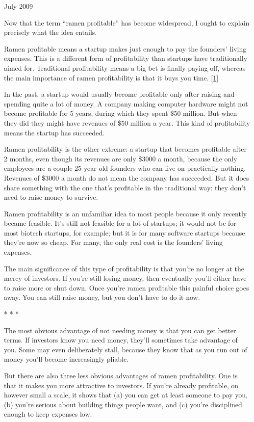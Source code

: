 July 2009

Now that the term ``ramen profitable'' has become widespread, I ought to
explain precisely what the idea entails.

Ramen profitable means a startup makes just enough to pay the founders'
living expenses. This is a different form of profitability than startups
have traditionally aimed for. Traditional profitability means a big bet
is finally paying off, whereas the main importance of ramen
profitability is that it buys you time. {[}\hyperref[f1n]{1}{]}

In the past, a startup would usually become profitable only after
raising and spending quite a lot of money. A company making computer
hardware might not become profitable for 5 years, during which they
spent \$50 million. But when they did they might have revenues of \$50
million a year. This kind of profitability means the startup has
succeeded.

Ramen profitability is the other extreme: a startup that becomes
profitable after 2 months, even though its revenues are only \$3000 a
month, because the only employees are a couple 25 year old founders who
can live on practically nothing. Revenues of \$3000 a month do not mean
the company has succeeded. But it does share something with the one
that's profitable in the traditional way: they don't need to raise money
to survive.

Ramen profitability is an unfamiliar idea to most people because it only
recently became feasible. It's still not feasible for a lot of startups;
it would not be for most biotech startups, for example; but it is for
many software startups because they're now so cheap. For many, the only
real cost is the founders' living expenses.

The main significance of this type of profitability is that you're no
longer at the mercy of investors. If you're still losing money, then
eventually you'll either have to raise more or shut down. Once you're
ramen profitable this painful choice goes away. You can still raise
money, but you don't have to do it now.

* * *

The most obvious advantage of not needing money is that you can get
better terms. If investors know you need money, they'll sometimes take
advantage of you. Some may even deliberately stall, because they know
that as you run out of money you'll become increasingly pliable.

But there are also three less obvious advantages of ramen profitability.
One is that it makes you more attractive to investors. If you're already
profitable, on however small a scale, it shows that (a) you can get at
least someone to pay you, (b) you're serious about building things
people want, and (c) you're disciplined enough to keep expenses low.

